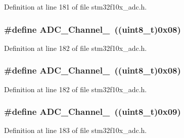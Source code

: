 Definition at line 181 of file stm32f10x\+\_\+adc.\+h.

\subsubsection[{\texorpdfstring{A\+D\+C\+\_\+\+Channel\+\_\+8}{ADC_Channel_8}}]{\setlength{\rightskip}{0pt plus 5cm}\#define A\+D\+C\+\_\+\+Channel\+\_~(({\bf uint8\+\_\+t})0x08)}\hypertarget{group___a_d_c__channels_ga99b2c662d4068152e0e80a048036cc48}{}\label{group___a_d_c__channels_ga99b2c662d4068152e0e80a048036cc48}


Definition at line 182 of file stm32f10x\+\_\+adc.\+h.

\subsubsection[{\texorpdfstring{A\+D\+C\+\_\+\+Channel\+\_\+8}{ADC_Channel_8}}]{\setlength{\rightskip}{0pt plus 5cm}\#define A\+D\+C\+\_\+\+Channel\+\_~(({\bf uint8\+\_\+t})0x08)}\hypertarget{group___a_d_c__channels_ga99b2c662d4068152e0e80a048036cc48}{}\label{group___a_d_c__channels_ga99b2c662d4068152e0e80a048036cc48}


Definition at line 182 of file stm32f10x\+\_\+adc.\+h.

\subsubsection[{\texorpdfstring{A\+D\+C\+\_\+\+Channel\+\_\+9}{ADC_Channel_9}}]{\setlength{\rightskip}{0pt plus 5cm}\#define A\+D\+C\+\_\+\+Channel\+\_~(({\bf uint8\+\_\+t})0x09)}\hypertarget{group___a_d_c__channels_ga01a61c428be0cb69327e428e32a42aa1}{}\label{group___a_d_c__channels_ga01a61c428be0cb69327e428e32a42aa1}


Definition at line 183 of file stm32f10x\+\_\+adc.\+h.

